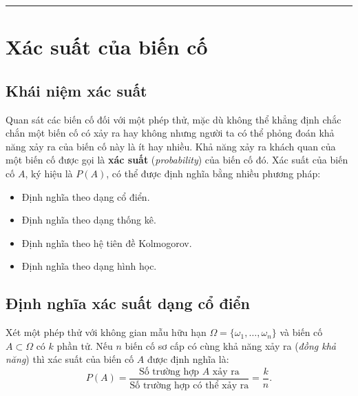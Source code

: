 \documentclass[12pt,a4paper]{article}
\theoremstyle{definition}
\begin{document}
\vspace{1em}
\hrule
\vspace{1.5em}

\section{Xác suất của biến cố}

\subsection{Khái niệm xác suất}
Quan sát các biến cố đối với một phép thử, mặc dù không thể khẳng định chắc chắn một biến cố có xảy ra hay không nhưng người ta có thể phỏng đoán khả năng xảy ra của biến cố này là ít hay nhiều.
Khả năng xảy ra khách quan của một biến cố được gọi là \textbf{xác suất} (\textit{probability}) của biến cố đó.
Xác suất của biến cố $A$, ký hiệu là $P(A)$, có thể được định nghĩa bằng nhiều phương pháp:
\begin{itemize}[leftmargin=1.5em]
    \item Định nghĩa theo dạng cổ điển.
    \item Định nghĩa theo dạng thống kê.
    \item Định nghĩa theo hệ tiên đề Kolmogorov.
    \item Định nghĩa theo dạng hình học.
\end{itemize}

\subsection{Định nghĩa xác suất dạng cổ điển}
Xét một phép thử với không gian mẫu hữu hạn $\Omega = \{\omega_1, \dots, \omega_n\}$ và biến cố $A \subset \Omega$ có $k$ phần tử. Nếu $n$ biến cố sơ cấp có cùng khả năng xảy ra (\textit{đồng khả năng}) thì xác suất của biến cố $A$ được định nghĩa là:
\[
P(A) = \frac{\text{Số trường hợp } A \text{ xảy ra}}{\text{Số trường hợp có thể xảy ra}} = \frac{k}{n}.
\]
\end{document}
